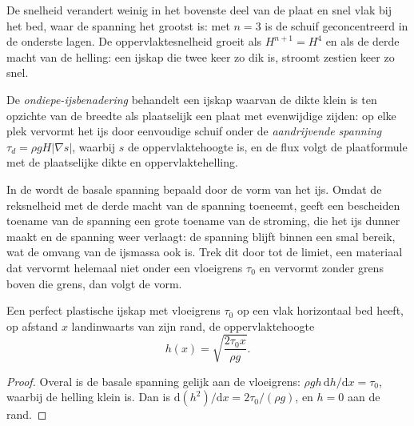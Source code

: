 De snelheid verandert weinig in het bovenste deel van de plaat en snel vlak bij het
bed, waar de spanning het grootst is: met $n = 3$ is de schuif geconcentreerd in
de onderste lagen. De oppervlaktesnelheid groeit als $H^{n+1} = H^4$ en als de
derde macht van de helling: een ijskap die twee keer zo dik is, stroomt zestien keer zo snel.

\begin{definition}\label{def:b3:glaciology:sia}
De \emph{ondiepe-ijsbenadering} behandelt een ijskap waarvan de
dikte klein is ten opzichte van de breedte als plaatselijk een plaat met evenwijdige
zijden: op elke plek vervormt het ijs door eenvoudige schuif onder
de \emph{aandrijvende spanning} $\tau_d = \rho gH|\nabla s|$, waarbij $s$ de
oppervlaktehoogte is, en de flux volgt de plaatformule met de plaatselijke
dikte en oppervlaktehelling.
\end{definition}

In de  wordt de basale spanning bepaald door de vorm
van het ijs. Omdat de reksnelheid met de derde macht van de spanning toeneemt, geeft een
bescheiden toename van de spanning een grote toename van de stroming, die het ijs
dunner maakt en de spanning weer verlaagt: de spanning blijft binnen een smal bereik,
wat de omvang van de ijsmassa ook is. Trek dit door tot de limiet, een materiaal dat
vervormt helemaal niet onder een vloeigrens $\tau_0$ en vervormt zonder grens
boven die grens, dan volgt de vorm.

\begin{proposition}\label{prop:b3:glaciology:nye}
Een perfect plastische ijskap met vloeigrens $\tau_0$ op een vlak horizontaal bed heeft, op
afstand $x$ landinwaarts van zijn rand, de oppervlaktehoogte
\[
h(x) = \sqrt{\frac{2\tau_0x}{\rho g}} .
\]
\end{proposition}

\begin{proof}
Overal is de basale spanning gelijk aan de vloeigrens: $\rho gh\,\mathrm
dh/\mathrm dx = \tau_0$, waarbij de helling klein is. Dan is $\mathrm d(h^2)/\mathrm
dx = 2\tau_0/(\rho g)$, en $h = 0$ aan de rand.
\end{proof}

